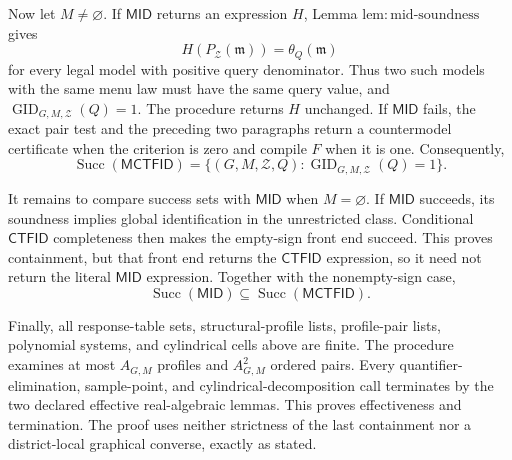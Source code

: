 Now let \(M\ne\varnothing\).  If \(\mathsf{MID}\) returns an expression \(H\), Lemma \(\mathrm{lem:mid\text{-}soundness}\) gives
\[
 H(P_{\mathcal Z}(\mathfrak m))=\theta_Q(\mathfrak m)
\]
for every legal model with positive query denominator.  Thus two such models with the same menu law must have the same query value, and \(\operatorname{GID}_{G,M,\mathcal Z}(Q)=1\).  The procedure returns \(H\) unchanged.  If \(\mathsf{MID}\) fails, the exact pair test and the preceding two paragraphs return a countermodel certificate when the criterion is zero and compile \(F\) when it is one.  Consequently,
\[
 \operatorname{Succ}(\mathsf{MCTFID})
 =\{(G,M,\mathcal Z,Q):
   \operatorname{GID}_{G,M,\mathcal Z}(Q)=1\}.
\]

It remains to compare success sets with \(\mathsf{MID}\) when \(M=\varnothing\).  If \(\mathsf{MID}\) succeeds, its soundness implies global identification in the unrestricted class.  Conditional \(\mathsf{CTFID}\) completeness then makes the empty-sign front end succeed.  This proves containment, but that front end returns the \(\mathsf{CTFID}\) expression, so it need not return the literal \(\mathsf{MID}\) expression.  Together with the nonempty-sign case,
\[
 \operatorname{Succ}(\mathsf{MID})
 \subseteq\operatorname{Succ}(\mathsf{MCTFID}).
\]

Finally, all response-table sets, structural-profile lists, profile-pair lists, polynomial systems, and cylindrical cells above are finite.  The procedure examines at most \(A_{G,M}\) profiles and \(A_{G,M}^2\) ordered pairs.  Every quantifier-elimination, sample-point, and cylindrical-decomposition call terminates by the two declared effective real-algebraic lemmas.  This proves effectiveness and termination.  The proof uses neither strictness of the last containment nor a district-local graphical converse, exactly as stated.